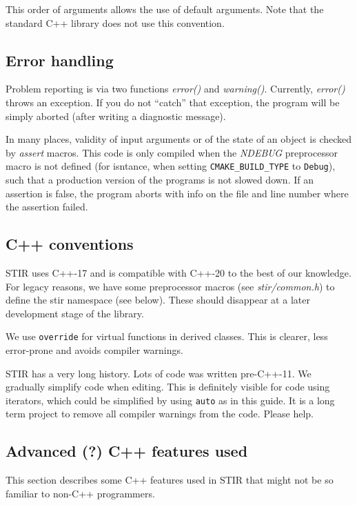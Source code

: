 \documentclass{article}
\begin{document}
This order of arguments allows the use of default arguments. 
Note that the standard C++ library does not use this convention.

\subsection{
Error handling }

Problem reporting is via two functions \textit{error()} and \textit{warning()}. 
Currently, \textit{error()} throws an exception. If you do not ``catch'' that
exception, the program will be simply aborted (after writing 
a diagnostic message). 

In many places, validity of input arguments or of the state of 
an object is checked by \textit{assert} macros. This code is only 
compiled when the \textit{NDEBUG} preprocessor macro is not defined (for isntance,
when setting \texttt{CMAKE\_BUILD\_TYPE} to \texttt{Debug}), 
such that a production version of the programs 
is not slowed down. If an assertion is false, the program aborts 
with info on the file and line number where the assertion failed.

\subsection{C++ conventions}
STIR uses C++-17 and is compatible with C++-20 to the best of our knowledge.
For legacy reasons, we have some preprocessor 
macros (see \textit{stir/common.h}) to define the stir namespace (see below).
These should disappear at a 
later development stage of the library.

We use \texttt{override} for virtual functions in derived classes. This is clearer,
less error-prone and avoids compiler warnings.

STIR has a very long history. Lots of code was written pre-C++-11. We gradually simplify
code when editing. This is definitely visible for code using iterators, which could be
simplified by using \texttt{auto} as in this guide. It is a long term project to
remove all compiler warnings from the code. Please help.

\subsection{\label{ssect:AdvancedCppFeatures}
Advanced (?) C++ features used}


This section describes some C++ features used in STIR that might not be so familiar to
non-C++ programmers.
\end{document}
